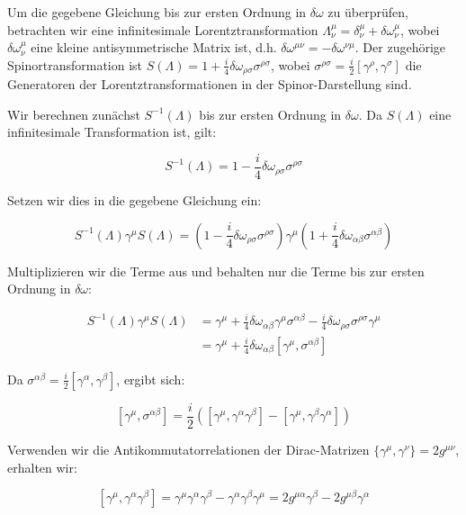 Um die gegebene Gleichung bis zur ersten Ordnung in $\delta \omega$ zu überprüfen, betrachten wir eine infinitesimale Lorentztransformation $\Lambda^\mu_\nu = \delta^\mu_\nu + \delta \omega^\mu_\nu$, wobei $\delta \omega^\mu_\nu$ eine kleine antisymmetrische Matrix ist, d.h. $\delta \omega^{\mu\nu} = -\delta \omega^{\nu\mu}$. Der zugehörige Spinortransformation ist $S(\Lambda) = 1 + \frac{i}{4} \delta \omega_{\rho\sigma} \sigma^{\rho\sigma}$, wobei $\sigma^{\rho\sigma} = \frac{i}{2} [\gamma^\rho, \gamma^\sigma]$ die Generatoren der Lorentztransformationen in der Spinor-Darstellung sind.

Wir berechnen zunächst $S^{-1}(\Lambda)$ bis zur ersten Ordnung in $\delta \omega$. Da $S(\Lambda)$ eine infinitesimale Transformation ist, gilt:

\[
S^{-1}(\Lambda) = 1 - \frac{i}{4} \delta \omega_{\rho\sigma} \sigma^{\rho\sigma}
\]

Setzen wir dies in die gegebene Gleichung ein:

\[
S^{-1}(\Lambda) \gamma^\mu S(\Lambda) = \left(1 - \frac{i}{4} \delta \omega_{\rho\sigma} \sigma^{\rho\sigma}\right) \gamma^\mu \left(1 + \frac{i}{4} \delta \omega_{\alpha\beta} \sigma^{\alpha\beta}\right)
\]

Multiplizieren wir die Terme aus und behalten nur die Terme bis zur ersten Ordnung in $\delta \omega$:

\[
\begin{align*}
S^{-1}(\Lambda) \gamma^\mu S(\Lambda) &= \gamma^\mu + \frac{i}{4} \delta \omega_{\alpha\beta} \gamma^\mu \sigma^{\alpha\beta} - \frac{i}{4} \delta \omega_{\rho\sigma} \sigma^{\rho\sigma} \gamma^\mu \\
&= \gamma^\mu + \frac{i}{4} \delta \omega_{\alpha\beta} [\gamma^\mu, \sigma^{\alpha\beta}]
\end{align*}
\]

Da $\sigma^{\alpha\beta} = \frac{i}{2} [\gamma^\alpha, \gamma^\beta]$, ergibt sich:

\[
[\gamma^\mu, \sigma^{\alpha\beta}] = \frac{i}{2} \left( [\gamma^\mu, \gamma^\alpha \gamma^\beta] - [\gamma^\mu, \gamma^\beta \gamma^\alpha] \right)
\]

Verwenden wir die Antikommutatorrelationen der Dirac-Matrizen $\{\gamma^\mu, \gamma^\nu\} = 2g^{\mu\nu}$, erhalten wir:

\[
[\gamma^\mu, \gamma^\alpha \gamma^\beta] = \gamma^\mu \gamma^\alpha \gamma^\beta - \gamma^\alpha \gamma^\beta \gamma^\mu = 2g^{\mu\alpha} \gamma^\beta - 2g^{\mu\beta} \gamma^\alpha
\]

